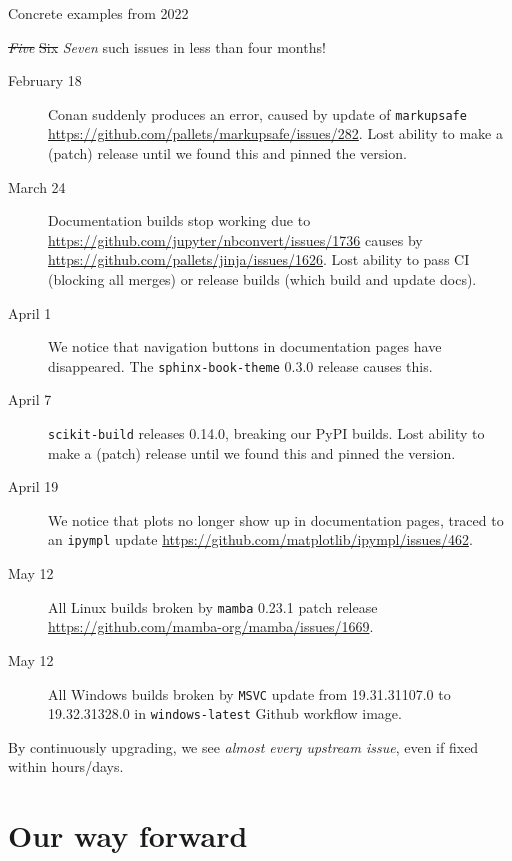 \documentclass[english,aspectratio=1610,smaller]{beamer}
\begin{document}
\begin{frame}[fragile]{Concrete examples from 2022}
  \vspace{-2mm}
  \footnotesize
  \begin{block}{\sout{\emph{Five}} \sout{Six} \emph{Seven} such issues in less than four months!}
    \begin{description}
      \item[February 18] Conan suddenly produces an error, caused by update of \texttt{markupsafe} \url{https://github.com/pallets/markupsafe/issues/282}.
        Lost ability to make a (patch) release until we found this and pinned the version.
      \item[March 24] Documentation builds stop working due to \url{https://github.com/jupyter/nbconvert/issues/1736} causes by \url{https://github.com/pallets/jinja/issues/1626}.
        Lost ability to pass CI (blocking all merges) or release builds (which build and update docs).
      \item[April 1] We notice that navigation buttons in documentation pages have disappeared. The \texttt{sphinx-book-theme} 0.3.0 release causes this.
      \item[April 7] \texttt{scikit-build} releases 0.14.0, breaking our PyPI builds.
        Lost ability to make a (patch) release until we found this and pinned the version.
      \item[April 19] We notice that plots no longer show up in documentation pages, traced to an \texttt{ipympl} update \url{https://github.com/matplotlib/ipympl/issues/462}.
      \item[May 12] All Linux builds broken by \texttt{mamba} 0.23.1 patch release \url{https://github.com/mamba-org/mamba/issues/1669}.
      \item[May 12] All Windows builds broken by \texttt{MSVC} update from 19.31.31107.0 to 19.32.31328.0 in \texttt{windows-latest} Github workflow image.
    \end{description}
  \end{block}
  By continuously upgrading, we see \emph{almost every upstream issue}, even if fixed within hours/days.
\end{frame}

\section{Our way forward}
\end{document}
